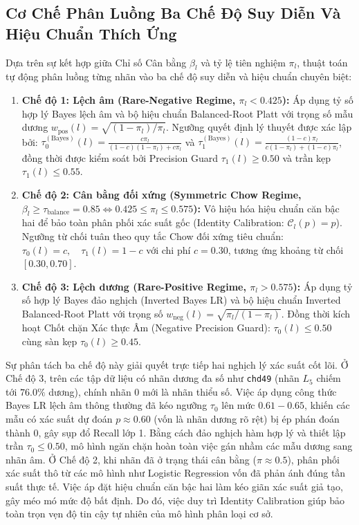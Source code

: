\documentclass[10pt,a4paper,twoside]{article}
\begin{document}
\subsection{Cơ Chế Phân Luồng Ba Chế Độ Suy Diễn Và Hiệu Chuẩn Thích Ứng}
Dựa trên sự kết hợp giữa Chỉ số Cân bằng $\beta_l$ và tỷ lệ tiên nghiệm $\pi_l$, thuật toán tự động phân luồng từng nhãn vào ba chế độ suy diễn và hiệu chuẩn chuyên biệt:
\begin{enumerate}[leftmargin=*]
    \item \textbf{Chế độ 1: Lệch âm (Rare-Negative Regime, $\pi_l < 0.425$):}         Áp dụng tỷ số hợp lý Bayes lệch âm và bộ hiệu chuẩn Balanced-Root Platt với trọng số mẫu dương         $w_{\text{pos}}(l) = \sqrt{(1-\pi_l)/\pi_l}$. Ngưỡng quyết định lý thuyết được xác lập bởi:         $\tau_0^{(\text{Bayes})}(l) = \frac{c \pi_l}{(1-c)(1-\pi_l) + c \pi_l}$ và         $\tau_1^{(\text{Bayes})}(l) = \frac{(1-c)\pi_l}{c(1-\pi_l) + (1-c)\pi_l}$,         đồng thời được kiểm soát bởi Precision Guard $\tau_1(l) \ge 0.50$ và trần kẹp $\tau_1(l) \le 0.55$.
    \item \textbf{Chế độ 2: Cân bằng đối xứng (Symmetric Chow Regime, $\beta_l \ge \tau_{\text{balance}} = 0.85 \Leftrightarrow 0.425 \le \pi_l \le 0.575$):}         Vô hiệu hóa hiệu chuẩn căn bậc hai để bảo toàn phân phối xác suất gốc (Identity Calibration: $\mathcal{C}_l(p) = p$).         Ngưỡng từ chối tuân theo quy tắc Chow đối xứng tiêu chuẩn: $\tau_0(l) = c, \quad \tau_1(l) = 1 - c$ với chi phí $c=0.30$,         tương ứng khoảng từ chối $[0.30, 0.70]$.
    \item \textbf{Chế độ 3: Lệch dương (Rare-Positive Regime, $\pi_l > 0.575$):}         Áp dụng tỷ số hợp lý Bayes đảo nghịch (Inverted Bayes LR) và bộ hiệu chuẩn Inverted Balanced-Root Platt với trọng số         $w_{\text{neg}}(l) = \sqrt{\pi_l / (1 - \pi_l)}$.         Đồng thời kích hoạt Chốt chặn Xác thực Âm (Negative Precision Guard): $\tau_0(l) \le 0.50$ cùng sàn kẹp $\tau_0(l) \ge 0.45$.
\end{enumerate}
Sự phân tách ba chế độ này giải quyết trực tiếp hai nghịch lý xác suất cốt lõi. Ở Chế độ 3, trên các tập dữ liệu có nhãn dương đa số như \texttt{chd49} (nhãn $L_5$ chiếm tới $76.0\%$ dương), chính nhãn 0 mới là nhãn thiểu số. Việc áp dụng công thức Bayes LR lệch âm thông thường đã kéo ngưỡng $\tau_0$ lên mức $0.61 - 0.65$, khiến các mẫu có xác suất dự đoán $p \approx 0.60$ (vốn là nhãn dương rõ rệt) bị ép phán đoán thành 0, gây sụp đổ Recall lớp 1. Bằng cách đảo nghịch hàm hợp lý và thiết lập trần $\tau_0 \le 0.50$, mô hình ngăn chặn hoàn toàn việc gán nhầm các mẫu dương sang nhãn âm. Ở Chế độ 2, khi nhãn đã ở trạng thái cân bằng ($\pi \approx 0.5$), phân phối xác suất thô từ các mô hình như Logistic Regression vốn đã phản ánh đúng tần suất thực tế. Việc áp đặt hiệu chuẩn căn bậc hai làm kéo giãn xác suất giả tạo, gây méo mó mức độ bất định. Do đó, việc duy trì Identity Calibration giúp bảo toàn trọn vẹn độ tin cậy tự nhiên của mô hình phân loại cơ sở.
\end{document}
